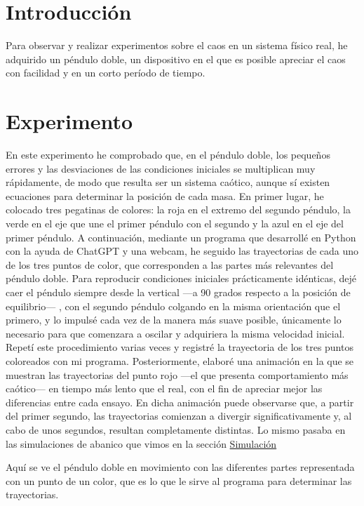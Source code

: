 \documentclass[
  10pt,
  a4paper,
  DIV=11,
  numbers=noendperiod,
  open=any]{scrreprt}
\numberwithin{equation}{chapter}
\numberwithin{equation}{chapter}
\renewcommand{\[}{\begin{equation}}
\renewcommand{\]}{\end{equation}}
\begin{document}
\section{Introducción}\label{introducciuxf3n-3}

Para observar y realizar experimentos sobre el caos en un sistema físico
real, he adquirido un péndulo doble, un dispositivo en el que es posible
apreciar el caos con facilidad y en un corto período de tiempo.

\section{Experimento}\label{experimento}

En este experimento he comprobado que, en el péndulo doble, los pequeños
errores y las desviaciones de las condiciones iniciales se multiplican
muy rápidamente, de modo que resulta ser un sistema caótico, aunque sí
existen ecuaciones para determinar la posición de cada masa. En primer
lugar, he colocado tres pegatinas de colores: la roja en el extremo del
segundo péndulo, la verde en el eje que une el primer péndulo con el
segundo y la azul en el eje del primer péndulo. A continuación, mediante
un programa que desarrollé en Python con la ayuda de ChatGPT y una
webcam, he seguido las trayectorias de cada uno de los tres puntos de
color, que corresponden a las partes más relevantes del péndulo doble.
Para reproducir condiciones iniciales prácticamente idénticas, dejé caer
el péndulo siempre desde la vertical ---a 90 grados respecto a la
posición de equilibrio--- , con el segundo péndulo colgando en la misma
orientación que el primero, y lo impulsé cada vez de la manera más suave
posible, únicamente lo necesario para que comenzara a oscilar y
adquiriera la misma velocidad inicial. Repetí este procedimiento varias
veces y registré la trayectoria de los tres puntos coloreados con mi
programa. Posteriormente, elaboré una animación en la que se muestran
las trayectorias del punto rojo ---el que presenta comportamiento más
caótico--- en tiempo más lento que el real, con el fin de apreciar mejor
las diferencias entre cada ensayo. En dicha animación puede observarse
que, a partir del primer segundo, las trayectorias comienzan a divergir
significativamente y, al cabo de unos segundos, resultan completamente
distintas. Lo mismo pasaba en las simulaciones de abanico que vimos en
la sección \hyperref[sec-abanico]{Simulación}

Aquí se ve el péndulo doble en movimiento con las diferentes partes
representada con un punto de un color, que es lo que le sirve al
programa para determinar las trayectorias.
\end{document}

